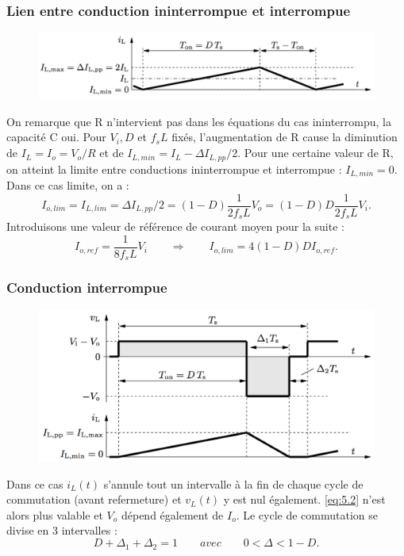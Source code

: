 		\subsubsection{Lien entre conduction ininterrompue et interrompue}
			\begin{figure}
			\vspace{-5mm}
			\includegraphics[scale=0.3]{ch5/6}
			\end{figure}	
			On remarque que R n'intervient pas dans les équations du cas ininterrompu, la capacité C oui. Pour $V_i, D$ et $f_s L$ fixés, l'augmentation de R cause la diminution de $I_L = I_o = V_o/R$ et de $I_{L,min}=I_L - \Delta I_{L,pp}/2$. Pour une certaine valeur de R, on atteint la limite entre conductions ininterrompue et interrompue : $I_{L,min}=0$. Dans ce cas limite, on a :
			\begin{equation}
				I_{o,lim} = I_{L,lim} = \Delta I_{L,pp}/2 = (1-D)\frac{1}{2f_sL}V_o = (1-D)D\frac{1}{2f_sL}V_i.
			\end{equation}
			Introduisons une valeur de référence de courant moyen pour la suite :
			\begin{equation}
				I_{o,ref} = \frac{1}{8f_sL}V_i \qquad \Rightarrow \qquad I_{o,lim} = 4(1-D)DI_{o,ref}.
			\end{equation}
			
		\subsubsection{Conduction interrompue}
			\begin{figure}
			\vspace{-5mm}
			\includegraphics[scale=0.3]{ch5/7}
			\end{figure}	
			Dans ce cas $i_L(t)$ s'annule tout un intervalle à la fin de chaque cycle de commutation (avant refermeture) et $v_L(t)$ y est nul également. \eqref{eq:5.2} n'est alors plus valable et $V_o$ dépend également de $I_o$. Le cycle de commutation se divise en 3 intervalles :
			\begin{equation}
				D + \Delta _1 + \Delta _2 = 1 \qquad avec \qquad 0<\Delta < 1-D.
			\end{equation}
			
